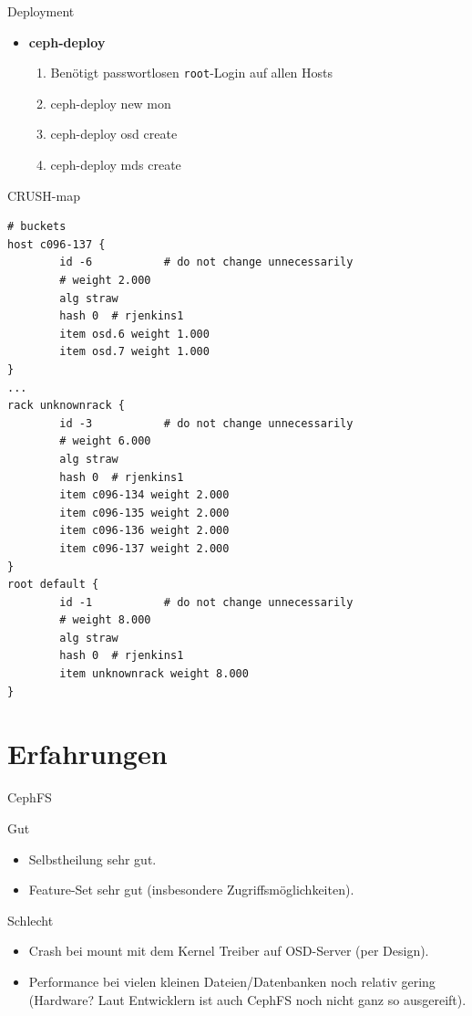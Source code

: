 \documentclass[hyperref={xetex}]{beamer}
\begin{document}
\begin{frame}{Deployment}
	\begin{itemize}
		\item \textbf{ceph-deploy}
			\begin{enumerate}
				\item Ben\"otigt passwortlosen \texttt{root}-Login auf allen Hosts
        \item ceph-deploy new mon
        \item ceph-deploy osd create
				\item ceph-deploy mds create
			\end{enumerate}
	\end{itemize}
\end{frame}


\begin{frame}[fragile]{CRUSH-map}
    \begin{lstlisting}
# buckets
host c096-137 {
        id -6           # do not change unnecessarily
        # weight 2.000   
        alg straw
        hash 0  # rjenkins1
        item osd.6 weight 1.000
        item osd.7 weight 1.000
}
...
rack unknownrack {
        id -3           # do not change unnecessarily
        # weight 6.000
        alg straw
        hash 0  # rjenkins1
        item c096-134 weight 2.000
        item c096-135 weight 2.000
        item c096-136 weight 2.000
        item c096-137 weight 2.000
}
root default {
        id -1           # do not change unnecessarily
        # weight 8.000
        alg straw
        hash 0  # rjenkins1
        item unknownrack weight 8.000
}
\end{lstlisting}
\end{frame}

\section{Erfahrungen}

\begin{frame}{CephFS}
    \begin{block}{Gut}
      \begin{itemize}
        \item Selbstheilung sehr gut.
        \item Feature-Set sehr gut (insbesondere Zugriffsmöglichkeiten).
      \end{itemize}
        
    \end{block}
    \begin{block}{Schlecht}
    \begin{itemize}
        \item Crash bei mount mit dem Kernel Treiber auf OSD-Server (per Design).
        \item Performance bei vielen kleinen Dateien/Datenbanken noch relativ gering (Hardware? Laut Entwicklern ist auch CephFS noch nicht ganz so ausgereift).
    \end{itemize}
\end{block}
\end{frame}
\end{document}
